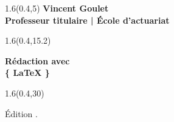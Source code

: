\begingroup

\textblockorigin{0mm}{0mm}
\begin{frame}[plain]
  \begin{textblock*}{1.6\TPHorizModule}(0.4\TPHorizModule,5\TPVertModule)
    \titles\bfseries
    \fontsize{10}{11}\selectfont
    Vincent Goulet \\
    \mdseries
    \fontsize{9}{11}\selectfont
    Professeur titulaire | École d'actuariat
  \end{textblock*}

  \begin{textblock*}{1.6\TPHorizModule}(0.4\TPHorizModule,15.2\TPVertModule)
    \raggedright%
    \titles\bfseries
    \fontsize{20}{20}\selectfont
    Rédaction avec \\
    \rmfamily\mdseries
    \fontsize{22.5}{22.5}\selectfont
    \fontsize{40}{40}\selectfont%
    \{%
    \fontsize{35}{35}\selectfont%
    \LaTeX
    \fontsize{40}{40}\selectfont%
    \}
  \end{textblock*}

  \begin{textblock*}{1.6\TPHorizModule}(0.4\TPHorizModule,30\TPVertModule)
    \begin{minipage}{\textwidth}
      \titles\mdseries
      \fontsize{9}{11}\selectfont
      Édition {\year}.{\oldstyle \month}
    \end{minipage}
  \end{textblock*}
\end{frame}
\endgroup

